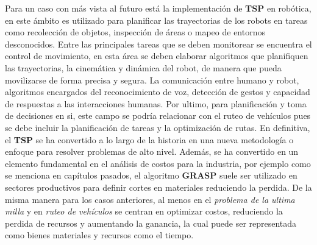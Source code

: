             Para un caso con más vista al futuro está la implementación de \textbf{TSP} en robótica, en este ámbito es utilizado para planificar las trayectorias de los robots en tareas como recolección de objetos, inspección de áreas o mapeo de entornos desconocidos. 
            \newline
            \newline 
            Entre las principales tareas que se deben monitorear se encuentra el control de movimiento, en esta área se deben elaborar algoritmos que planifiquen las trayectorias, la cinemática y dinámica del robot, de manera que pueda movilizarse de forma precisa y segura. La comunicación entre humano y robot, algoritmos encargados del reconocimiento de voz, detección de gestos y capacidad de respuestas a las interacciones humanas. Por ultimo, para planificación y toma de decisiones en si, este campo se podría relacionar con el ruteo de vehículos pues se debe incluir la planificación de tareas y la optimización de rutas.
    \newline
    \newline 
    En definitiva, el \textbf{TSP} se ha convertido a lo largo de la historia en una nueva metodología o enfoque para resolver problemas de alto nivel. Además, se ha convertido en un elemento fundamental en el análisis de costos para la industria, por ejemplo como se menciona en capítulos pasados, el algoritmo \textbf{GRASP} suele ser utilizado en sectores productivos para definir cortes en materiales reduciendo la perdida. 
    \newline
    \newline 
    De la misma manera para los casos anteriores, al menos en el \textit{problema de la ultima milla} y en \textit{ruteo de vehículos} se centran en optimizar costos, reduciendo la perdida de recursos y aumentando la ganancia, la cual puede ser representada como bienes materiales y recursos como el tiempo.